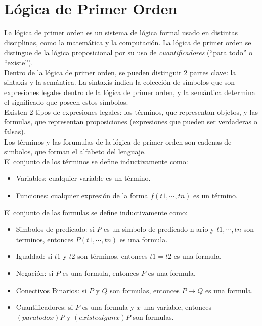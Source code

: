 \documentclass[12pt,titlepage]{article}
\begin{document}
\newpage

\section{Lógica de Primer Orden}

La lógica de primer orden es un sistema de lógica formal usado en distintas disciplinas, como la matemática y la computación. La lógica de primer orden se distingue de la lógica proposicional por su uso de \emph{cuantificadores} (``para todo'' o ``existe''). \\

Dentro de la lógica de primer orden, se pueden distinguir 2 partes clave: la sintaxis y la semántica. La sintaxis indica la colección de símbolos que son expresiones legales dentro de la lógica de primer orden, y la semántica determina el significado que poseen estos símbolos. \\

Existen 2 tipos de expresiones legales: los términos, que representan objetos, y las formulas, que representan proposiciones (expresiones que pueden ser verdaderas o falsas). \\

Los términos y las forumulas de la lógica de primer orden son cadenas de simbolos, que forman el alfabeto del lenguaje. \\

El conjunto de los términos se define inductivamente como: \\
\begin{itemize}
    \item Variables: cualquier variable es un término.
    \item Funciones: cualquier expresión de la forma $f(t1,\cdots,tn)$ es un término.
\end{itemize}
El conjunto de las formulas se define inductivamente como: \\
\begin{itemize}
    \item Simbolos de predicado: si $P$ es un simbolo de predicado n-ario y $t1,\cdots,tn$ son terminos, entonces $P(t1,\cdots,tn)$ es una formula.
    \item Igualdad: si $t1$ y $t2$ son términos, entonces $t1=t2$ es una formula.
    \item Negación: si $P$ es una formula, entonces $P$ es una formula. %
    \item Conectivos Binarios: si $P$ y $Q$ son formulas, entonces $P \rightarrow Q$ es una formula. %
    \item Cuantificadores: si $P$ es una formula y $x$ una variable, entonces $(para todo x)P$ y $(existe algun x)P$ son formulas. %
\end{itemize}
\end{document}

